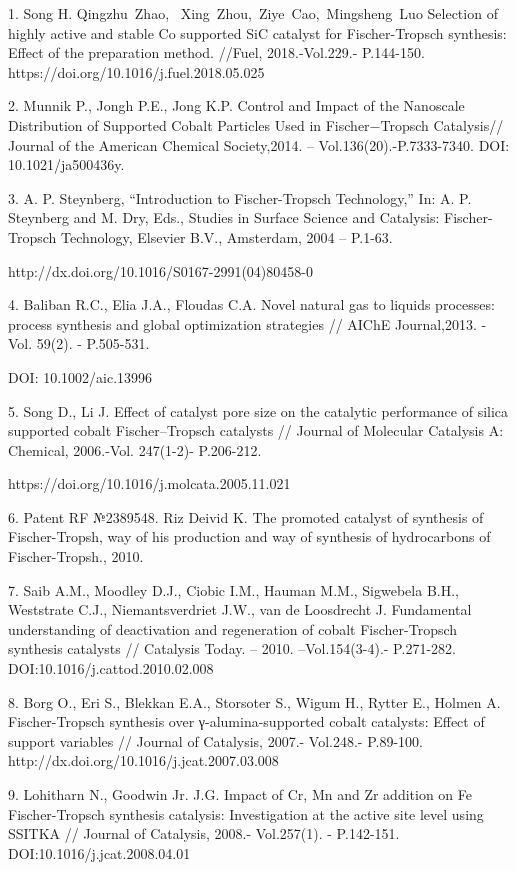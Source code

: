 \begin{noparindent}
1. Song H. Qingzhu~Zhao,~ Xing~Zhou,~Ziye~Cao,~Mingsheng~Luo Selection
of highly active and stable Co supported SiC catalyst for
Fischer-Tropsch synthesis: Effect of the preparation method. //Fuel,
2018.-Vol.229.- P.144-150. https://doi.org/10.1016/j.fuel.2018.05.025

2. Munnik P., Jongh P.E., Jong K.P. Control and Impact of the Nanoscale
Distribution of Supported Cobalt Particles Used in Fischer−Tropsch
Catalysis// Journal of the American Chemical Society,2014. --
Vol.136(20).-P.7333-7340. DOI: 10.1021/ja500436y.~

3. A. P. Steynberg, ``Introduction to Fischer-Tropsch Technology,'' In:
A. P. Steynberg and M. Dry, Eds., Studies in Surface Science and
Catalysis: Fischer-Tropsch Technology, Elsevier B.V., Amsterdam, 2004 --
P.1-63.

http://dx.doi.org/10.1016/S0167-2991(04)80458-0

4. Baliban R.C., Elia J.A., Floudas C.A. Novel natural gas to liquids
processes: process synthesis and global optimization strategies // AIChE
Journal,2013. - Vol. 59(2). - P.505-531.

DOI: 10.1002/aic.13996

5. Song D., Li J. Effect of catalyst pore size on the catalytic
performance of silica supported cobalt Fischer--Tropsch catalysts //
Journal of Molecular Catalysis A: Chemical, 2006.-Vol. 247(1-2)-
P.206-212.

https://doi.org/10.1016/j.molcata.2005.11.021

6. Patent RF №2389548. Riz Deivid K. The promoted catalyst of synthesis
of Fischer-Tropsh, way of his production and way of synthesis of
hydrocarbons of Fischer-Tropsh., 2010.

7. Saib A.M., Moodley D.J., Ciobic I.M., Hauman M.M., Sigwebela B.H.,
Weststrate C.J., Niemantsverdriet J.W., van de Loosdrecht J. Fundamental
understanding of deactivation and regeneration of cobalt Fischer-Tropsch
synthesis catalysts // Catalysis Today. -- 2010. --Vol.154(3-4).-
P.271-282. DOI:10.1016/j.cattod.2010.02.008

8. Borg O., Eri S., Blekkan E.A., Storsoter S., Wigum H., Rytter E.,
Holmen A. Fischer-Tropsch synthesis over γ-alumina-supported cobalt
catalysts: Effect of support variables // Journal of Catalysis, 2007.-
Vol.248.- P.89-100. http://dx.doi.org/10.1016/j.jcat.2007.03.008

9. Lohitharn N., Goodwin Jr. J.G. Impact of Cr, Mn and Zr addition on Fe
Fischer-Tropsch synthesis catalysis: Investigation at the active site
level using SSITKA // Journal of Catalysis, 2008.- Vol.257(1). -
P.142-151. DOI:10.1016/j.jcat.2008.04.01


\end{noparindent}
